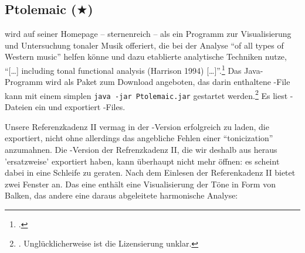 %
%
%

\subsection{Ptolemaic ($\bigstar$)}

\label{Ptolemaic} wird auf seiner Homepage -- sternenreich -- als
ein Programm zur Visualisierung und Untersuchung tonaler Musik offeriert, die
bei der Analyse \enquote{of all types of Western music} helfen könne und dazu
etablierte analytische Techniken nutze, \enquote{[\ldots] including tonal
functional analysis (Harrison 1994) [\ldots]}.\footcite[vgl.][\nopage
wp.]{Ptolemaic2016a} Das Java-Programm wird als Paket zum Download angeboten, das
darin enthaltene -File kann mit einem simplen \texttt{java -jar
Ptolemaic.jar} gestartet werden.\footnote{\cite[vgl.][\nopage
wp.]{Ptolemaic2016b}. Unglücklicherweise ist die Lizensierung unklar.} Es liest
-Dateien ein und exportiert -Files.

Unsere Referenzkadenz II vermag  in der -Version
erfolgreich zu laden, die  exportiert, nicht ohne allerdings das
angebliche Fehlen einer \enquote{tonicization} anzumahnen. Die
-Version der Refrenzkadenz II, die wir deshalb aus 
heraus 'ersatzweise' exportiert haben, kann  überhaupt nicht mehr
öffnen: es scheint dabei in eine Schleife zu geraten. Nach dem Einlesen der
Referenkadenz II bietet  zwei Fenster an. Das eine enthält eine
Visualisierung der Töne in Form von Balken, das andere eine daraus abgeleitete
harmonische Analyse:


